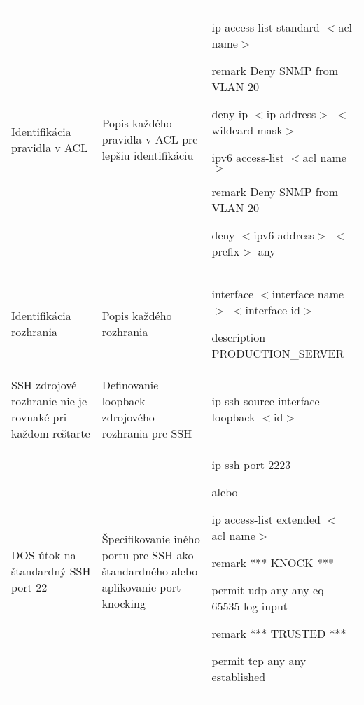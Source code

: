 \begin{longtable}[!htbp]{|L{10em}L{10em}>{\selectfont}L{34em}|}
	
	
	
	 Identifikácia pravidla v ACL	&Popis každého pravidla v ACL pre lepšiu identifikáciu	&ip access-list standard $<$acl name$>$
	
	\hspace{0.5em}remark Deny SNMP from VLAN 20
	
	\hspace{0.5em}deny ip $<$ip address$>$ $<$wildcard mask$>$
	\vspace{0.5em}
	
	ipv6 access-list $<$acl name$>$
	
	\hspace{0.5em}remark Deny SNMP from VLAN 20
	
	\hspace{0.5em}deny $<$ipv6 address$>$ $<$prefix$>$ any\\
	
	
	
	
	Identifikácia rozhrania	&Popis každého rozhrania	&interface $<$interface name$>$ $<$interface id$>$
	
	\hspace{0.5em}description PRODUCTION\_SERVER\\
	
	
	
	
	SSH zdrojové rozhranie nie je rovnaké pri každom reštarte	& Definovanie loopback zdrojového rozhrania pre SSH	&ip ssh source-interface loopback $<$id$>$\\
	
	
	
	
	DOS útok na štandardný SSH port 22	&Špecifikovanie iného portu pre SSH ako štandardného alebo aplikovanie port knocking	&ip ssh port 2223
	
	\vspace{0.5em}
	{\selectfont alebo}
	\vspace{0.5em}
	
	ip access-list extended $<$acl name$>$
	
	\hspace{0.5em}remark *** KNOCK ***
	
	\hspace{0.5em}permit udp any any eq 65535 log-input
	
	\hspace{0.5em}remark *** TRUSTED ***
	
	\hspace{0.5em}permit tcp any any established
	

\end{longtable}
